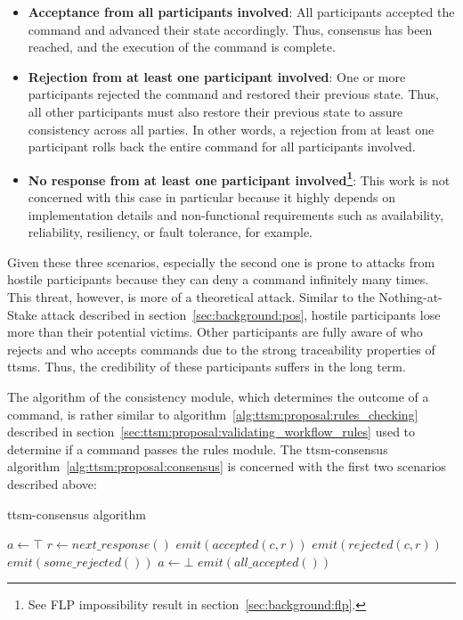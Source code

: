 \begin{itemize}
    \item \textbf{Acceptance from all participants involved}: All participants accepted the command and advanced their state accordingly. Thus, consensus has been reached, and the execution of the command is complete.
    \item \textbf{Rejection from at least one participant involved}: One or more participants rejected the command and restored their previous state. Thus, all other participants must also restore their previous state to assure consistency across all parties. In other words, a rejection from at least one participant rolls back the entire command for all participants involved.
    \item \textbf{No response from at least one participant involved\footnote{See FLP impossibility result in section~\ref{sec:background:flp}.}}: This work is not concerned with this case in particular because it highly depends on implementation details and non-functional requirements such as availability, reliability, resiliency, or fault tolerance, for example.
\end{itemize}

Given these three scenarios, especially the second one is prone to attacks from hostile participants because they can deny a command infinitely many times. This threat, however, is more of a theoretical attack. Similar to the Nothing-at-Stake attack described in section~\ref{sec:background:pos}, hostile participants lose more than their potential victims. Other participants are fully aware of who rejects and who accepts commands due to the strong traceability properties of \glspl{ttsm}. Thus, the credibility of these participants suffers in the long term.

The algorithm of the consistency module, which determines the outcome of a command, is rather similar to algorithm~\ref{alg:ttsm:proposal:rules_checking} described in section~\ref{sec:ttsm:proposal:validating_workflow_rules} used to determine if a command passes the rules module. The \gls{ttsm}-consensus algorithm~\ref{alg:ttsm:proposal:consensus} is concerned with the first two scenarios described above:

\begin{algorithm}
\caption{\gls{ttsm}-consensus algorithm}
\label{alg:ttsm:proposal:consensus}
$a \gets \top$\;
{
    $r \leftarrow next\_response()$\;
    {
        $emit(accepted(c, r))$\;
    }
    {
        $emit(rejected(c, r))$\;
        {
            $emit(some\_rejected())$\;
        }
        $a \gets \bot$\;
    }
}
{
    $emit(all\_accepted())$\;
}
\end{algorithm}

